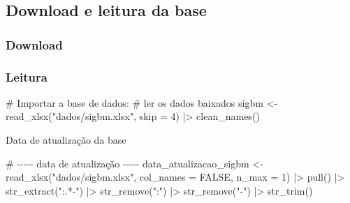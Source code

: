 \documentclass[
  letterpaper,
  DIV=11,
  numbers=noendperiod]{scrartcl}
\newenvironment{Shaded}{\begin{snugshade}}{\end{snugshade}}
\newcommand{\AttributeTok}[1]{\textcolor[rgb]{0.40,0.45,0.13}{#1}}
\newcommand{\CommentTok}[1]{\textcolor[rgb]{0.37,0.37,0.37}{#1}}
\newcommand{\ConstantTok}[1]{\textcolor[rgb]{0.56,0.35,0.01}{#1}}
\newcommand{\DecValTok}[1]{\textcolor[rgb]{0.68,0.00,0.00}{#1}}
\newcommand{\FunctionTok}[1]{\textcolor[rgb]{0.28,0.35,0.67}{#1}}
\newcommand{\NormalTok}[1]{\textcolor[rgb]{0.00,0.23,0.31}{#1}}
\newcommand{\OtherTok}[1]{\textcolor[rgb]{0.00,0.23,0.31}{#1}}
\newcommand{\SpecialCharTok}[1]{\textcolor[rgb]{0.37,0.37,0.37}{#1}}
\newcommand{\StringTok}[1]{\textcolor[rgb]{0.13,0.47,0.30}{#1}}
\begin{document}
\hypertarget{download-e-leitura-da-base}{%
\subsection{Download e leitura da
base}\label{download-e-leitura-da-base}}

\hypertarget{download}{%
\subsubsection{Download}\label{download}}

\hypertarget{leitura}{%
\subsubsection{Leitura}\label{leitura}}

\begin{Shaded}
\begin{Highlighting}[]
\CommentTok{\# Importar a base de dados:}
\CommentTok{\# ler os dados baixados}
\NormalTok{sigbm }\OtherTok{\textless{}{-}} \FunctionTok{read\_xlsx}\NormalTok{(}\StringTok{"dados/sigbm.xlsx"}\NormalTok{, }\AttributeTok{skip =} \DecValTok{4}\NormalTok{) }\SpecialCharTok{|\textgreater{}}
  \FunctionTok{clean\_names}\NormalTok{()}
\end{Highlighting}
\end{Shaded}

Data de atualização da base

\begin{Shaded}
\begin{Highlighting}[]
\CommentTok{\# {-}{-}{-}{-}{-} data de atualização {-}{-}{-}{-}{-}}
\NormalTok{data\_atualizacao\_sigbm }\OtherTok{\textless{}{-}} \FunctionTok{read\_xlsx}\NormalTok{(}\StringTok{"dados/sigbm.xlsx"}\NormalTok{,}
                                    \AttributeTok{col\_names =} \ConstantTok{FALSE}\NormalTok{,}
                                    \AttributeTok{n\_max =} \DecValTok{1}\NormalTok{) }\SpecialCharTok{|\textgreater{}}
  \FunctionTok{pull}\NormalTok{() }\SpecialCharTok{|\textgreater{}}
  \FunctionTok{str\_extract}\NormalTok{(}\StringTok{":.*{-}"}\NormalTok{) }\SpecialCharTok{|\textgreater{}}
  \FunctionTok{str\_remove}\NormalTok{(}\StringTok{":"}\NormalTok{) }\SpecialCharTok{|\textgreater{}}
  \FunctionTok{str\_remove}\NormalTok{(}\StringTok{"{-}"}\NormalTok{) }\SpecialCharTok{|\textgreater{}}
  \FunctionTok{str\_trim}\NormalTok{()}
\end{Highlighting}
\end{Shaded}
\end{document}
